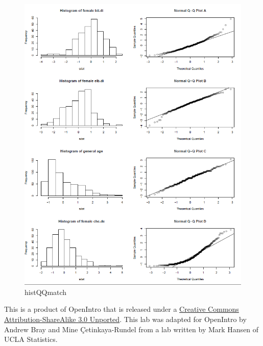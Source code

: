 \documentclass[]{article}
\begin{document}
\begin{figure}[htbp]
\centering
\includegraphics{more/histQQmatch.png}
\caption{histQQmatch}
\end{figure}

\hypertarget{license}{}
This is a product of OpenIntro that is released under a
\href{http://creativecommons.org/licenses/by-sa/3.0}{Creative Commons
Attribution-ShareAlike 3.0 Unported}. This lab was adapted for OpenIntro
by Andrew Bray and Mine Çetinkaya-Rundel from a lab written by Mark
Hansen of UCLA Statistics.
\end{document}

